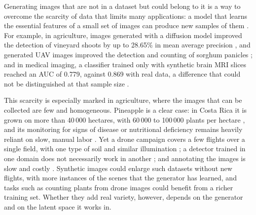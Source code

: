 
Generating images that are not in a dataset but could belong to it is a way to overcome the scarcity of data that limits many applications: a model that learns the essential features of a small set of images can produce new samples of them \cite{Hu2025}. For example, in agriculture, images generated with a diffusion model improved the detection of vineyard shoots by up to 28.65\% in mean average precision \cite{Hirahara2025}, and generated UAV images improved the detection and counting of sorghum panicles \cite{Cai2022}; and in medical imaging, a classifier trained only with synthetic brain MRI slices reached an AUC of 0.779, against 0.869 with real data, a difference that could not be distinguished at that sample size \cite{Fallah2026}.

This scarcity is especially marked in agriculture, where the images that can be collected are few and homogeneous. Pineapple is a clear case: in Costa Rica it is grown on more than 40\,000 hectares, with 60\,000 to 100\,000 plants per hectare \cite{Castro2019}, and its monitoring for signs of disease or nutritional deficiency remains heavily reliant on slow, manual labor \cite{Gonzalez2026}. Yet a drone campaign covers a few flights over a single field, with one type of soil and similar illumination \cite{Gonzalez2026}; a detector trained in one domain does not necessarily work in another \cite{Bumbaca2025}; and annotating the images is slow and costly \cite{Bah2018,Cai2022}. Synthetic images could enlarge such datasets without new flights, with more instances of the scenes that the generator has learned, and tasks such as counting plants from drone images \cite{Kitano2019,Shiu2023} could benefit from a richer training set. Whether they add real variety, however, depends on the generator and on the latent space it works in.

